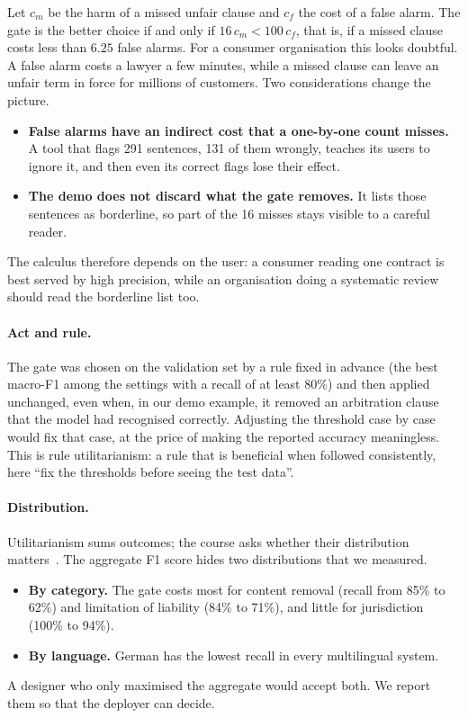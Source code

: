 Let $c_m$ be the harm of a missed unfair clause and $c_f$ the cost of a false alarm. The gate is the better choice if and only if $16\,c_m < 100\,c_f$, that is, if a missed clause costs less than $6.25$ false alarms. For a consumer organisation this looks doubtful. A false alarm costs a lawyer a few minutes, while a missed clause can leave an unfair term in force for millions of customers. Two considerations change the picture.
\begin{itemize}
  \item \textbf{False alarms have an indirect cost that a one-by-one count misses.} A tool that flags 291 sentences, 131 of them wrongly, teaches its users to ignore it, and then even its correct flags lose their effect.
  \item \textbf{The demo does not discard what the gate removes.} It lists those sentences as borderline, so part of the 16 misses stays visible to a careful reader.
\end{itemize}
The calculus therefore depends on the user: a consumer reading one contract is best served by high precision, while an organisation doing a systematic review should read the borderline list too.

\paragraph{Act and rule.} The gate was chosen on the validation set by a rule fixed in advance (the best macro-F1 among the settings with a recall of at least 80\%) and then applied unchanged, even when, in our demo example, it removed an arbitration clause that the model had recognised correctly. Adjusting the threshold case by case would fix that case, at the price of making the reported accuracy meaningless. This is rule utilitarianism: a rule that is beneficial when followed consistently, here ``fix the thresholds before seeing the test data''.

\paragraph{Distribution.} Utilitarianism sums outcomes; the course asks whether their distribution matters~\citep{slides_consequentialism}. The aggregate F1 score hides two distributions that we measured.
\begin{itemize}
  \item \textbf{By category.} The gate costs most for content removal (recall from 85\% to 62\%) and limitation of liability (84\% to 71\%), and little for jurisdiction (100\% to 94\%).
  \item \textbf{By language.} German has the lowest recall in every multilingual system.
\end{itemize}
A designer who only maximised the aggregate would accept both. We report them so that the deployer can decide.

